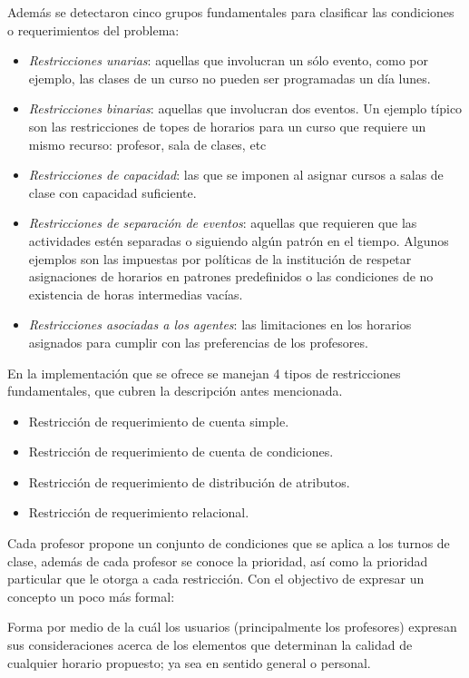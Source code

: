 Además se detectaron cinco grupos fundamentales para clasificar las condiciones o requerimientos del problema:
\begin{itemize}
	\item \textit{Restricciones unarias}: aquellas que involucran un sólo evento, como por ejemplo, las clases de un curso no pueden ser programadas un día lunes.
	\item \textit{Restricciones binarias}: aquellas que involucran dos eventos. Un ejemplo típico son las restricciones de topes de horarios para un curso que requiere un mismo recurso: profesor, sala de clases, etc
	\item \textit{Restricciones de capacidad}: las que se imponen al asignar cursos a salas de clase con capacidad suficiente.
	\item \textit{Restricciones de separación de eventos}:  aquellas que requieren que las actividades estén separadas o siguiendo algún patrón en el tiempo. Algunos ejemplos son las impuestas por políticas de la institución de respetar asignaciones de horarios en patrones predefinidos o las condiciones de no existencia de horas intermedias vacías.
	\item \textit{Restricciones asociadas a los  agentes}: las limitaciones en los horarios asignados para cumplir con las preferencias de los profesores.
\end{itemize}

En la implementación que se ofrece se manejan 4 tipos de restricciones fundamentales, que cubren la descripción antes mencionada.
\begin{itemize}
	\item Restricción de requerimiento de cuenta simple.
	\item Restricción de requerimiento de cuenta de condiciones.
	\item Restricción de requerimiento de distribución de atributos.
	\item Restricción de requerimiento relacional.
\end{itemize}

Cada profesor propone un conjunto de condiciones que se aplica a los turnos de clase, además de cada profesor se conoce la prioridad, así como la prioridad particular que le otorga a cada restricción. 
Con el objectivo de expresar un concepto un poco más formal: 
\begin{dfn}[Restricción]
	Forma por medio de la cuál los usuarios (principalmente los profesores) expresan sus consideraciones acerca de los elementos que determinan la calidad de cualquier horario propuesto; ya sea en sentido general o personal.
\end{dfn} 

